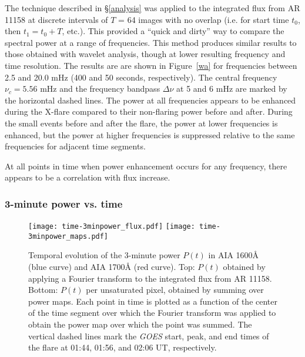 The technique described in \S\ref{analysis} was applied
to the integrated flux from AR 11158 at
discrete intervals of $T$ = 64 images with no overlap
(i.e. for start time $t_{0}$, then $t_{1} = t_{0}+T$, etc.).
This provided a ``quick and dirty'' way
to compare the spectral power at a range of frequencies.
This method produces similar results to those
obtained with wavelet analysis, though
at lower resulting frequency and time resolution.
The results are are shown in \myfig Figure~\ref{wa}
for frequencies between 2.5 and 20.0 mHz (400 and 50 seconds, respectively).
The central frequency $\nu_{c} = 5.56$ mHz
and the frequency bandpass $\Delta\nu$ at 5 and 6 mHz
are marked by the horizontal dashed lines.
The power at all frequencies
appears to be enhanced during the X-flare compared to their
non-flaring power before and after.
During the small events before and after the flare,
the power at lower frequencies is enhanced,
but the power at higher frequencies is suppressed relative to
the same frequencies for adjacent time segments.

At all points in time when power enhancement occurs for any frequency,
there appears to be a correlation with flux increase.

\subsubsection{3-minute power vs. time}

\begin{figure*}[htb!]\centering
    \texttt{[image: time-3minpower\_flux.pdf]}
    \texttt{[image: time-3minpower\_maps.pdf]}
    \caption{%
        Temporal evolution of the 3-minute power $P(t)$ in
        AIA 1600\AA{} (blue curve) and AIA 1700\AA{} (red curve).
        Top: $P(t)$ obtained by applying a Fourier transform to the
        integrated flux from AR 11158.
        Bottom: $P(t)$ per unsaturated pixel, obtained by summing over power maps.
        Each point in time
        is plotted as a function of the center
        of the time segment over which the Fourier transform was applied to
        obtain the power map over which the point was summed.
        The vertical dashed lines mark the \textit{GOES} start, peak, and end
        times of the flare at 01:44, 01:56, and 02:06 UT, respectively.
        \label{power_vs_time}}
\end{figure*}

